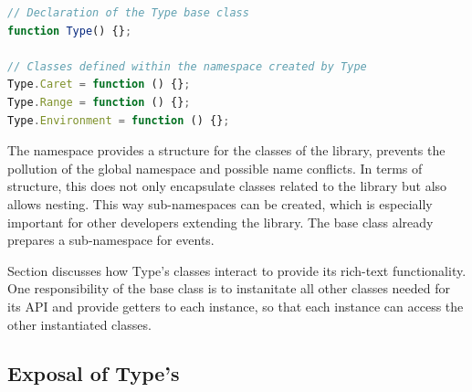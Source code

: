 \begin{lstlisting}[language=JavaScript, caption={Declaration of Caret, Range and Environment classes}, label=lst:type_declaration_example]
// Declaration of the Type base class
function Type() {};

// Classes defined within the namespace created by Type
Type.Caret = function () {};
Type.Range = function () {};
Type.Environment = function () {};
\end{lstlisting}

The namespace provides a structure for the classes of the library, prevents the pollution of the global namespace and possible name conflicts. In terms of structure, this does not only encapsulate classes related to the library but also allows nesting. This way sub-namespaces can be created, which is especially important for other developers extending the library. The  base class already prepares a sub-namespace  for events.

Section  discusses how Type's classes interact to provide its rich-text functionality. One responsibility of the  base class is to instanitate all other classes needed for its API and provide getters to each instance, so that each instance can access the other instantiated classes.



\subsection{Exposal of Type's }
\label{subsec_fn_exposal}

